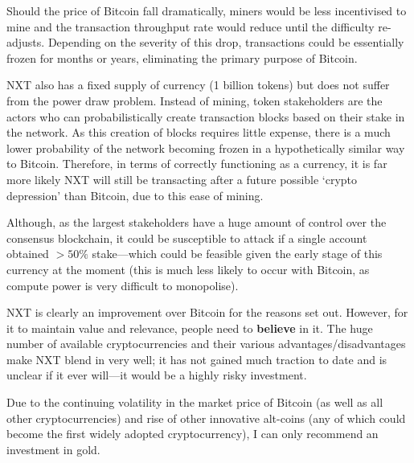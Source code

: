 \documentclass[11pt]{article}
\begin{document}
Should the price of Bitcoin fall dramatically, miners would be less incentivised to mine and the transaction throughput rate would reduce until the difficulty re-adjusts. Depending on the severity of this drop, transactions could be essentially frozen for months or years, eliminating the primary purpose of Bitcoin.

NXT also has a fixed supply of currency (1 billion tokens) but does not suffer from the power draw problem.
Instead of mining, token stakeholders are the actors who can probabilistically create transaction blocks based on their stake in the network.
As this creation of blocks requires little expense, there is a much lower probability of the network becoming frozen in a hypothetically similar way to Bitcoin. 
Therefore, in terms of correctly functioning as a currency, it is far more likely NXT will still be transacting after a future possible `crypto depression' than Bitcoin, due to this ease of mining. 

Although, as the largest stakeholders have a huge amount of control over the consensus blockchain, it could be susceptible to attack if a single account obtained $>50\%$ stake---which could be feasible given the early stage of this currency at the moment (this is much less likely to occur with Bitcoin, as compute power is very difficult to monopolise).

NXT is clearly an improvement over Bitcoin for the reasons set out. However, for it to maintain value and relevance, people need to \textbf{believe} in it. The huge number of available cryptocurrencies and their various advantages/disadvantages make NXT blend in very well; it has not gained much traction to date and is unclear if it ever will---it would be a highly risky investment.

Due to the continuing volatility in the market price of Bitcoin (as well as all other cryptocurrencies) and rise of other innovative alt-coins (any of which could become the first widely adopted cryptocurrency), I can only recommend an investment in gold. 
\end{document}
